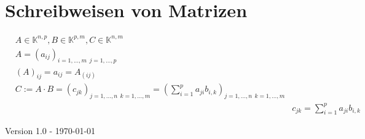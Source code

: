 \documentclass{scrartcl}
\begin{document}
	\section*{Schreibweisen von Matrizen}
		\begin{align*}
			&A \in \mathbb{K}^{n,p},
			B \in \mathbb{K}^{p,m},
			C \in \mathbb{K}^{n,m}
			\\
			&A = (a_{ij})_{i=1,...,m ~~ j=1,...,p}
			\\
			&(A)_{ij} = a_{ij} = A_{(ij)}
			\\
			&C := A \cdot B
				= (c_{jk})_{j=1,...,n ~~ k=1,...,m}
				= \left( \sum\limits_{i=1}^{p} a_{ji} b_{i,k} \right)_{j=1,...,n ~~ k=1,...,m}
			\\
			&&c_{jk}
				= \sum\limits_{i=1}^{p} a_{ji} b_{i,k}
		\end{align*}
	
		{\tiny
			Version 1.0 - \today
		}
\end{document}
